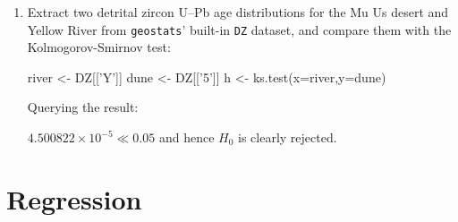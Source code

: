 \begin{enumerate}
\item Extract two detrital zircon U--Pb age distributions for the Mu
  Us desert and Yellow River from \texttt{geostats}' built-in
  \texttt{DZ} dataset, and compare them with the Kolmogorov-Smirnov
  test:

\begin{script}
river <- DZ[['Y']]
dune <- DZ[['5']]
h <- ks.test(x=river,y=dune)
\end{script}

Querying the result:


$4.500822^{-5}$ and hence $H_0$ is clearly rejected.

\end{enumerate}

\section{Regression}
\label{sec:R-regression}

